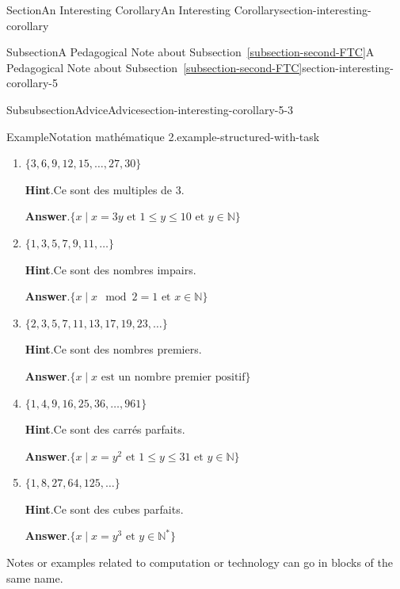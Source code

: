 \documentclass[twoside,10pt,]{article}
\newcommand{\blocktitlefont}{\relax}
\newcommand{\xreffont}{\relax}
\numberwithin{equation}{section}
\begin{document}
\begin{sectionptx}{Section}{An Interesting Corollary}{}{An Interesting Corollary}{}{}{section-interesting-corollary}
\begin{subsectionptx}{Subsection}{A Pedagogical Note about Subsection~{\xreffont\ref*{subsection-second-FTC}}}{}{A Pedagogical Note about Subsection~{\xreffont\ref*{subsection-second-FTC}}}{}{}{section-interesting-corollary-5}
\begin{subsubsectionptx}{Subsubsection}{Advice}{}{Advice}{}{}{section-interesting-corollary-5-3}
\begin{example}{Example}{Notation mathématique 2.}{example-structured-with-task}
\begin{enumerate}[font=\bfseries,label=(\alph*),ref=\alph*]
Donc, on peut écrire \(A=\lbrace x\mid x\in\mathbb{N}\text{ et } 1\leq x\leq 5\rbrace\).%
\item{}\(\{3,6,9,12,15,\ldots,27,30\}\)%
\par\smallskip%
\noindent\textbf{\blocktitlefont Hint}.\hypertarget{example-structured-with-task-5-2}{}\quad{}Ce sont des multiples de 3.%
\par\smallskip%
\noindent\textbf{\blocktitlefont Answer}.\hypertarget{example-structured-with-task-5-3}{}\quad{}\(\{x\mid x=3y \text{ et } 1\leq y\leq 10 \text{ et } y\in\mathbb{N}\}\)%
\item{}\(\{1,3,5,7,9,11,\ldots\}\)%
\par\smallskip%
\noindent\textbf{\blocktitlefont Hint}.\hypertarget{example-structured-with-task-6-2}{}\quad{}Ce sont des nombres impairs.%
\par\smallskip%
\noindent\textbf{\blocktitlefont Answer}.\hypertarget{example-structured-with-task-6-3}{}\quad{}\(\{x\mid x\mod 2=1 \text{ et } x\in\mathbb{N}\}\)%
\item{}\(\{2,3,5,7,11,13,17,19,23,\ldots\}\)%
\par\smallskip%
\noindent\textbf{\blocktitlefont Hint}.\hypertarget{example-structured-with-task-7-2}{}\quad{}Ce sont des nombres premiers.%
\par\smallskip%
\noindent\textbf{\blocktitlefont Answer}.\hypertarget{example-structured-with-task-7-3}{}\quad{}\(\{x\mid x\text{ est un nombre premier positif}\}\)%
\item{}\(\{1,4,9,16,25,36,\ldots,961\}\)%
\par\smallskip%
\noindent\textbf{\blocktitlefont Hint}.\hypertarget{example-structured-with-task-8-2}{}\quad{}Ce sont des carrés parfaits.%
\par\smallskip%
\noindent\textbf{\blocktitlefont Answer}.\hypertarget{example-structured-with-task-8-3}{}\quad{}\(\{x\mid x=y^2 \text{ et } 1\leq y\leq 31\text{ et } y\in\mathbb{N}\}\)%
\item{}\(\{1,8,27,64,125,\ldots\}\)%
\par\smallskip%
\noindent\textbf{\blocktitlefont Hint}.\hypertarget{example-structured-with-task-9-2}{}\quad{}Ce sont des cubes parfaits.%
\par\smallskip%
\noindent\textbf{\blocktitlefont Answer}.\hypertarget{example-structured-with-task-9-3}{}\quad{}\(\{x\mid x=y^3 \text{ et } y\in\mathbb{N^*}\}\)%
\end{enumerate}%
\end{example}
Notes or examples related to computation or technology can go in blocks of the same name.%

\end{subsubsectionptx}
\end{subsectionptx}
\end{sectionptx}
\end{document}
